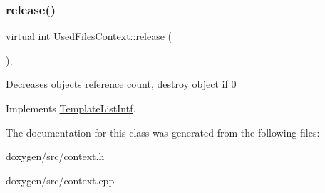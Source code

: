 \mbox{\label{class_used_files_context_ad179f197716bee4f11482390962cb180}} 
\subsubsection{\texorpdfstring{release()}{release()}}
{\footnotesize\ttfamily virtual int Used\+Files\+Context\+::release (\begin{DoxyParamCaption}{ }\end{DoxyParamCaption})\hspace{0.3cm}{\ttfamily [inline]}, {\ttfamily [virtual]}}

Decreases object\textquotesingle{}s reference count, destroy object if 0 

Implements \mbox{\hyperlink{class_template_list_intf_a0c53169c740c09dac47efc62bbe39674}{Template\+List\+Intf}}.



The documentation for this class was generated from the following files\+:\begin{DoxyCompactItemize}
\item 
doxygen/src/context.\+h\item 
doxygen/src/context.\+cpp\end{DoxyCompactItemize}
